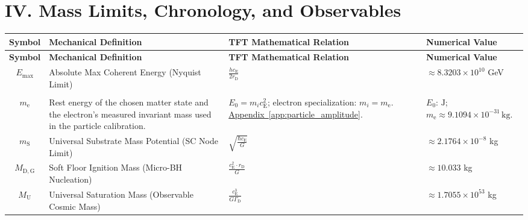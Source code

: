 \vspace{1cm}

\section*{IV. Mass Limits, Chronology, and Observables}

\vspace{0.5cm}
\noindent
\renewcommand{\arraystretch}{1.6}
\begin{longtable}{@{} c p{5.5cm} p{4cm} p{3.5cm} @{}}
\toprule
\textbf{Symbol} & \textbf{Mechanical Definition} & \textbf{TFT Mathematical Relation} & \textbf{Numerical Value} \\
\midrule
\endfirsthead

\toprule
\textbf{Symbol} & \textbf{Mechanical Definition} & \textbf{TFT Mathematical Relation} & \textbf{Numerical Value} \\
\midrule
\endhead

$E_{\mathrm{max}}$ & Absolute Max Coherent Energy (Nyquist Limit) & $\frac{h c_{\mathrm{E}}}{2r_{\mathrm{D}}}$ & $\approx 8.3203 \times 10^{10}$ GeV \\

\begin{tabular}[c]{@{}c@{}}$E_0$ \\ $m_{\mathrm e}$\end{tabular} & {\raggedright Rest energy of the chosen matter state and the electron's measured invariant mass used in the particle calibration.\par} & {\raggedright $E_0=m_i c_{\mathrm E}^2$; electron specialization: $m_i=m_{\mathrm e}$. \newline \hyperref[app:particle_amplitude]{Appendix~\ref*{app:particle_amplitude}}.\par} & {\raggedright $E_0$: $\mathrm J$; $m_{\mathrm e}\approx9.1094\times10^{-31}\,\mathrm{kg}$.\par} \\


$m_{\mathrm{S}}$ & Universal Substrate Mass Potential (SC Node Limit) & $\sqrt{\frac{\hbar c_{\mathrm{E}}}{G}}$ & $\approx 2.1764 \times 10^{-8}$ kg \\

$M_{\mathrm{D,G}}$ & Soft Floor Ignition Mass (Micro-BH Nucleation) & $\frac{c_{\mathrm{E}}^2 \cdot r_{\mathrm{D}}}{G}$ & $\approx 10.033$ kg \\

$M_{\mathrm{U}}$ & Universal Saturation Mass (Observable Cosmic Mass) & $\frac{c_{\mathrm{E}}^3}{G \Gamma_{\mathrm{D}}}$ & $\approx 1.7055 \times 10^{53}$ kg \\


\end{longtable}
